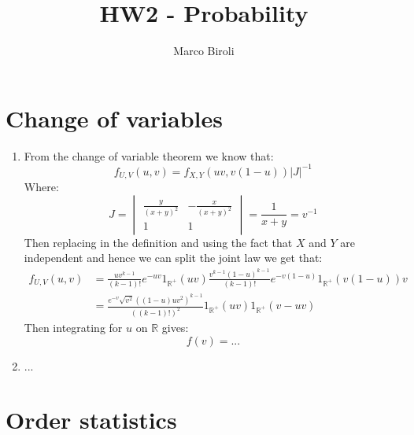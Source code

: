 \documentclass[10pt,a4paper]{article}
\author{Marco Biroli}
\title{HW2 - Probability}
\begin{document}
\maketitle

\section{Change of variables}
\begin{enumerate}

\item From the change of variable theorem we know that:
\[
f_{U, V}(u, v) = f_{X, Y}(uv, v(1 - u)) |J|^{-1}
\]
Where:
\[
J = \begin{vmatrix}
\frac{y}{(x+y)^2} & -\frac{x}{(x+y)^2}\\
1 & 1
\end{vmatrix} = \frac{1}{x+y} =  v^{-1}
\]
Then replacing in the definition and using the fact that $X$ and $Y$ are independent and hence we can split the joint law we get that:
\begin{align*}
f_{U,V}(u, v) &= \frac{uv^{k-1}}{(k-1)!} e^{-uv} 1_{\mathbb{R}^+}(uv) \frac{v^{k-1}(1 - u)^{k-1}}{(k - 1)!} e^{-v(1- u)} 1_{\mathbb{R}^+} (v(1 - u)) v\\
&= \frac{e^{-v} \sqrt{v^2} \left((1-u) u
   v^2\right)^{k-1}}{((k-1)!)^2} 1_{\mathbb{R}^+} (u v) 1_{\mathbb{R}^+}(v-u v)
\end{align*}
Then integrating for $u$ on $\mathbb{R}$ gives:
\[
f(v) = ...
\]

\item ...

\end{enumerate}

\section{Order statistics}
\end{document}
